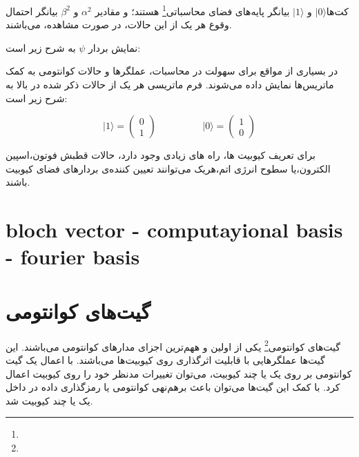 \documentclass{book}
\begin{document}
\newpage
کت‌ها$\vert 0 \rangle$ و $\vert 1 \rangle$ بیانگر پایه‌های فضای 
محاسباتی\footnote{} هستند؛ و مقادیر $\alpha^2$ و $\beta^2$ بیانگر احتمال وقوع هر یک از این حالات، در صورت مشاهده، می‌باشند.

نمایش بردار $\psi$ به شرح زیر است:
\begin{center}
\end{center}

در بسیاری از مواقع برای سهولت در محاسبات، عملگر‌ها و حالات کوانتومی به کمک ماتریس‌ها نمایش داده ‌می‌شوند. فرم ماتریسی هر یک از حالات ذکر شده در بالا به شرح زیر است:

\begin{equation}
	\vert 1 \rangle = \begin{pmatrix} 0 \\ 1 \end{pmatrix}
	\hspace{2cm}
	\vert 0 \rangle = \begin{pmatrix} 1 \\ 0 \end{pmatrix}	
\end{equation}

برای تعریف کیوبیت ها، راه های زیادی وجود دارد، حالات قطبش فوتون،‌اسپین الکترون،‌یا سطوح انرژی اتم،‌هریک می‌توانند تعیین کننده‌ی بردار‌های فضای کیوبیت باشند.

\section{bloch vector - computayional basis - fourier basis}
\section{گیت‌های کوانتومی}
گیت‌های کوانتومی\footnote{} یکی از اولین و ههم‌ترین اجزای‌ مدار‌های کوانتومی ‌می‌باشند. این گیت‌ها عملگر‌هایی با قابلیت اثر‌گذاری روی کیوبیت‌ها می‌باشند. با اعمال یک گیت کوانتومی بر روی یک یا چند کیوبیت، می‌توان تغییرات مدنظر خود را روی کیوبیت اعمال کرد. با کمک این گیت‌ها می‌توان باعث برهم‌نهی کوانتومی یا رمز‌گذاری داده در داخل یک یا چند کیوبیت شد.
\end{document}
